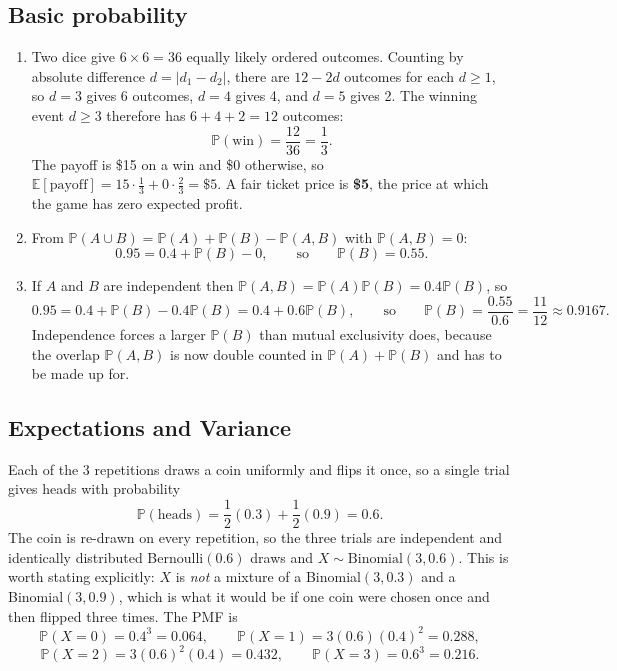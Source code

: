 \documentclass[11pt]{article}
\begin{document}
\subsection{Basic probability}

\begin{enumerate}
  \item Two dice give $6 \times 6 = 36$ equally likely ordered outcomes. Counting by absolute difference
        $d = |d_1 - d_2|$, there are $12 - 2d$ outcomes for each $d \ge 1$, so $d = 3$ gives 6 outcomes,
        $d = 4$ gives 4, and $d = 5$ gives 2. The winning event $d \ge 3$ therefore has
        $6 + 4 + 2 = 12$ outcomes:
        \[
          \mathbb{P}(\text{win}) = \frac{12}{36} = \frac{1}{3}.
        \]
        The payoff is \$15 on a win and \$0 otherwise, so
        $\mathbb{E}[\text{payoff}] = 15 \cdot \frac{1}{3} + 0 \cdot \frac{2}{3} = \$5$.
        A fair ticket price is \textbf{\$5}, the price at which the game has zero expected profit.

  \item From $\mathbb{P}(A \cup B) = \mathbb{P}(A) + \mathbb{P}(B) - \mathbb{P}(A,B)$ with
        $\mathbb{P}(A,B) = 0$:
        \[
          0.95 = 0.4 + \mathbb{P}(B) - 0,
          \qquad \text{so} \qquad
          \mathbb{P}(B) = \mathbf{0.55}.
        \]

  \item If $A$ and $B$ are independent then
        $\mathbb{P}(A,B) = \mathbb{P}(A)\mathbb{P}(B) = 0.4\mathbb{P}(B)$, so
        \[
          0.95 = 0.4 + \mathbb{P}(B) - 0.4\mathbb{P}(B) = 0.4 + 0.6\mathbb{P}(B),
          \qquad \text{so} \qquad
          \mathbb{P}(B) = \frac{0.55}{0.6} = \frac{11}{12} \approx \mathbf{0.9167}.
        \]
        Independence forces a larger $\mathbb{P}(B)$ than mutual exclusivity does, because the overlap
        $\mathbb{P}(A,B)$ is now double counted in $\mathbb{P}(A) + \mathbb{P}(B)$ and has to be made
        up for.
\end{enumerate}

\subsection{Expectations and Variance}

Each of the 3 repetitions draws a coin uniformly and flips it once, so a single trial gives heads with
probability
\[
  \mathbb{P}(\text{heads}) = \frac{1}{2}(0.3) + \frac{1}{2}(0.9) = 0.6.
\]
The coin is re-drawn on every repetition, so the three trials are independent and identically distributed
Bernoulli$(0.6)$ draws and $X \sim \text{Binomial}(3, 0.6)$. This is worth stating explicitly: $X$ is
\emph{not} a mixture of a Binomial$(3,0.3)$ and a Binomial$(3,0.9)$, which is what it would be if one coin
were chosen once and then flipped three times. The PMF is
\[
  \mathbb{P}(X = 0) = 0.4^3 = 0.064, \qquad
  \mathbb{P}(X = 1) = 3(0.6)(0.4)^2 = 0.288,
\]
\[
  \mathbb{P}(X = 2) = 3(0.6)^2(0.4) = 0.432, \qquad
  \mathbb{P}(X = 3) = 0.6^3 = 0.216.
\]
\end{document}
